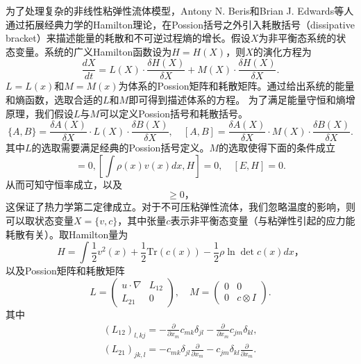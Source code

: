 为了处理复杂的非线性粘弹性流体模型，Antony N. Beris和Brian J. Edwards等人通过拓展经典力学的Hamilton理论，在Possion括号之外引入耗散括号（dissipative bracket）来描述能量的耗散和不可逆过程熵的增长\cite{edwards1990remarks,beris2013thermodynamics}。假设$X$为非平衡态系统的状态变量。系统的广义Hamilton函数设为$H=H(X)$，则$X$的演化方程为
\begin{equation*}
	\frac{dX}{dt} = L(X) \cdot \frac{\delta H(X)}{\delta X} + M(X) \cdot \frac{\delta H(X)}{\delta X} . 
\end{equation*}
$L=L(x)$和$M=M(x)$为体系的Possion矩阵和耗散矩阵。通过给出系统的能量和熵函数，选取合适的$L$和$M$即可得到描述体系的方程。 为了满足能量守恒和熵增原理，我们假设$L$与$M$可以定义Possion括号和耗散括号。
\begin{equation*}
	\{ A,B \} = \frac{\delta A(X)}{\delta X} \cdot L(X) \cdot \frac{\delta B(X)}{\delta X}, \quad  [ A,B ] = \frac{\delta A(X)}{\delta X} \cdot M(X) \cdot \frac{\delta B(X)}{\delta X}. 
\end{equation*}
其中$L$的选取需要满足经典的Possion括号定义。$M$的选取使得下面的条件成立
\begin{equation*}
	[\int \rho(x) dx, H]=0,[\int \rho(x) v(x) dx, H]=0, \quad [E,H] = 0.
\end{equation*}
从而可知守恒率成立，以及
\begin{equation*}
	[S,H] \ge 0，
\end{equation*}
这保证了热力学第二定律成立。对于不可压粘弹性流体，我们忽略温度的影响，则可以取状态变量$X= 
 \{v,c\}$，其中张量$c$表示非平衡态变量（与粘弹性引起的应力能耗散有关）。取Hamilton量为
 \begin{equation*}
 	H = \int \frac{1}{2} v^2(x) + \frac{1}{2} \mbox{
 	Tr}(c(x))- \frac{1}{2} \rho \ln \det c(x) dx，
 \end{equation*}
以及Possion矩阵和耗散矩阵
\begin{equation*}
	L = \left( \begin{array}{cc} 
			u \cdot \nabla &  L_{12} \\
			L_{21}& 0
		\end{array}\right), \quad
	M =	\left( \begin{array}{cc} 
			0  & 0 \\
			0  & c \otimes I
		\end{array}\right).
\end{equation*}
其中
\begin{eqnarray*}
	(L_{12})_{l,kj} = - \frac{\partial}{\partial x_m} c_{mk} \delta_{jl} -  \frac{\partial}{\partial x_m} c_{jm} \delta_{kl}, \\
	(L_{21})_{jk,l} = -c_{mk} \delta_{jl} \frac{\partial}{\partial x_m} - c_{jm} \delta_{kl} \frac{\partial}{\partial x_m}.
\end{eqnarray*}
